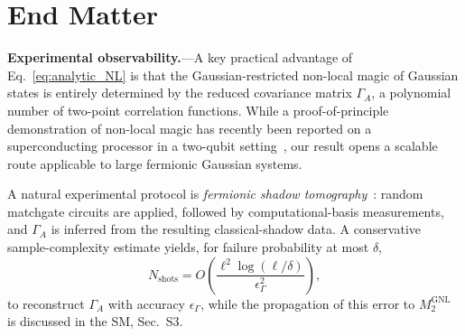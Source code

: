\documentclass[aps,prl,twocolumn,superscriptaddress,reprint,longbibliography,nofootinbib]{revtex4-2}
\begin{document}
\clearpage
\section*{End Matter}

\textbf{Experimental observability.}---A key practical advantage of Eq.~\eqref{eq:analytic_NL} is that the Gaussian-restricted non-local magic of Gaussian states is entirely determined by the reduced covariance matrix $\Gamma_A$, a polynomial number of two-point correlation functions.
While a proof-of-principle demonstration of non-local magic has recently been reported on a superconducting processor in a two-qubit setting~\cite{ahmad2025experimentaldemonstrationnonlocalmagic}, our result opens a scalable route applicable to large fermionic Gaussian systems.

A natural experimental protocol is \emph{fermionic shadow tomography}~\cite{Wan_2023}: random matchgate circuits are applied, followed by computational-basis measurements, and $\Gamma_A$ is inferred from the resulting classical-shadow data.
A conservative sample-complexity estimate yields, for failure probability at most $\delta$,
\[
N_{\mathrm{shots}} = O\!\left(\frac{\ell^2 \log(\ell/\delta)}{\epsilon_\Gamma^2}\right),
\]
to reconstruct \(\Gamma_A\) with accuracy \(\epsilon_\Gamma\), while the propagation of this error  to \(M_2^{\mathrm{GNL}}\) is discussed in  the SM, Sec.~S3.
\end{document}
